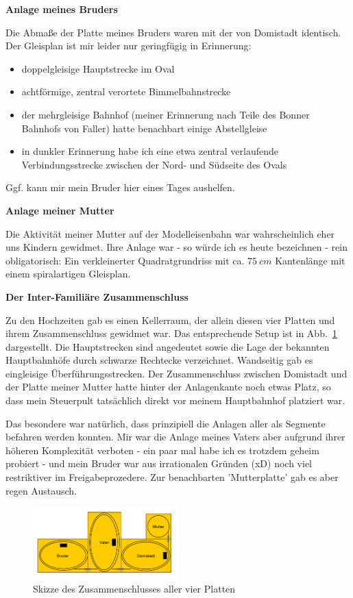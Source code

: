 \textbf{Anlage meines Bruders}

Die Abma{\ss}e der Platte meines Bruders waren mit der von Domistadt identisch.
Der Gleisplan ist mir leider nur geringf\"ugig in Erinnerung:
\begin{itemize}
	\item doppelgleisige Hauptstrecke im Oval
	\item achtf\"ormige, zentral verortete Bimmelbahnstrecke
	\item der mehrgleisige Bahnhof (meiner Erinnerung nach Teile des Bonner Bahnhofs von Faller) hatte benachbart einige Abstellgleise
	\item in dunkler Erinnerung habe ich eine etwa zentral verlaufende Verbindungsstrecke zwischen der Nord- und S\"udseite des Ovals
\end{itemize}
Ggf. kann mir mein Bruder hier eines Tages aushelfen.

\textbf{Anlage meiner Mutter}

Die Aktivit\"at meiner Mutter auf der Modelleisenbahn war wahrscheinlich eher uns Kindern gewidmet.
Ihre Anlage war - so w\"urde ich es heute bezeichnen - rein obligatorisch:
Ein verkleinerter Quadratgrundriss mit ca. $75~cm$ Kantenl\"ange mit einem spiralartigen Gleisplan.

\textbf{Der Inter-Famili\"are Zusammenschluss}

Zu den Hochzeiten gab es einen Kellerraum, der allein diesen vier Platten und ihrem Zusammenschluss gewidmet war.
Das entsprechende Setup ist in Abb.~\ref{img:elder_maps_keller_TA8} dargestellt.
Die Hauptstrecken sind angedeutet sowie die Lage der bekannten Hauptbahnh\"ofe durch schwarze Rechtecke verzeichnet.
Wandseitig gab es eingleisige \"Uberf\"uhrungsstrecken.
Der Zusammenschluss zwischen Domistadt und der Platte meiner Mutter hatte hinter der Anlagenkante noch etwas Platz, so dass mein Steuerpult tats\"achlich direkt vor meinem Hauptbahnhof platziert war.

Das besondere war nat\"urlich, dass prinzipiell die Anlagen aller als Segmente befahren werden konnten.
Mir war die Anlage meines Vaters aber aufgrund ihrer h\"oheren Komplexit\"at verboten - ein paar mal habe ich es trotzdem geheim probiert - und mein Bruder war aus irrationalen Gr\"unden (xD) noch viel restriktiver im Freigabeprozedere.
Zur benachbarten 'Mutterplatte' gab es aber regen Austausch.

\begin{figure}[h]
\centering
  \includegraphics[width=0.5\textwidth]{img/elder_maps/keller_TA8.pdf}
	\caption{Skizze des Zusammenschlusses aller vier Platten}
	\label{img:elder_maps_keller_TA8}
\end{figure}




